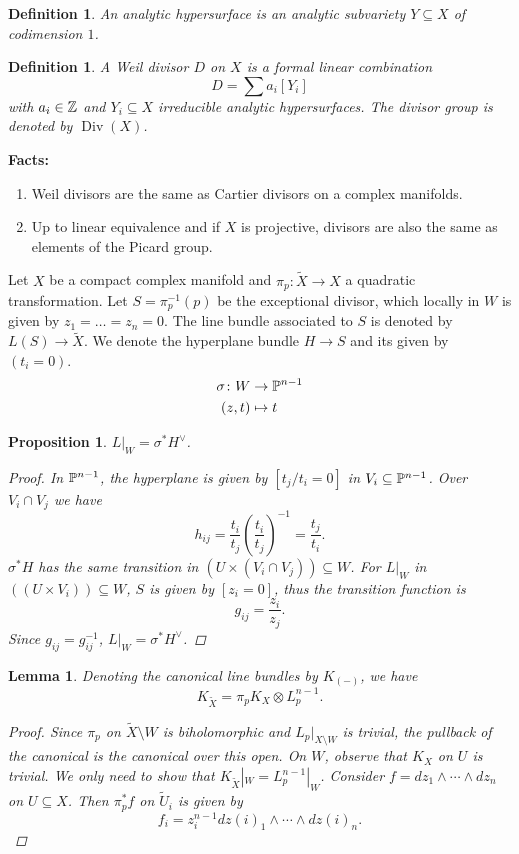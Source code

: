 \documentclass[A4paper, british, reqno]{amsart}
\theoremstyle{darkgreentheorem}
\newtheorem{lm}[thm]{Lemma}
\newtheorem{prop}[thm]{Proposition}
\theoremstyle{darkbluedefinition}
\newtheorem{defn}[thm]{Definition}
\theoremstyle{darkredexample}
\theoremstyle{remark}
\DeclareMathOperator{\Div}{Div}
\newcommand{\1}{\mathbbm{1}}
\newcommand{\ot}{\otimes}
\newcommand{\dual}{^{\vee}}
\newcommand{\tms}{\times}
\newcommand{\sub}{\subseteq}
\begin{document}
\begin{defn}
    An \textit{analytic hypersurface} is an analytic subvariety $Y\sub X$ of codimension $1$.
\end{defn}

\begin{defn}
    A \textit{Weil divisor} $D$ on $X$ is a formal linear combination
    \[ D=\sum a_{i}[Y_{i}] \]
    with $a_{i}\in \Z$ and $Y_{i}\sub X$ irreducible analytic hypersurfaces.
    The divisor group is denoted by $\Div(X)$.
\end{defn}

\textbf{Facts:}
\begin{enumerate}
    \item Weil divisors are the same as Cartier divisors on a complex manifolds.
    \item Up to linear equivalence and if $X$ is projective, divisors are also the same as elements of the Picard group.
\end{enumerate}

Let $X$ be a compact complex manifold and $\pi_{p}\colon \tilde{X}\to X$ a quadratic transformation.
Let $S=\pi_{p}^{-1}(p)$ be the exceptional divisor, which locally in $W$ is given by $z_{1}=\ldots =z_{n}=0$.
The line bundle associated to $S$ is denoted by $L(S)\to \tilde{X}$.
We denote the hyperplane bundle $H\to S$ and its given by $(t_{i}=0)$.
\begin{align*}
    \sigma \colon W & \to \P^{n-1} \\
    (z,t) & \mapsto t
\end{align*}

\begin{prop}
    $L|_{W}=\sigma^{*}H\dual$.
    \begin{proof}
	In $\P^{n-1}$, the hyperplane is given by $[t_{j}/t_{i}=0]$ in $V_{i}\sub \P^{n-1}$.
	Over $V_{i}\cap V_{j}$ we have
	\[ h_{ij}=\frac{t_{i}}{t_{j}}\left(\frac{t_{i}}{t_{j}}\right)^{-1}=\frac{t_{j}}{t_{i}}.\]
	$\sigma^{*}H$ has the same transition in $(U\tms (V_{i}\cap V_{j}))\sub W$.
	For $L|_{W}$ in $((U\tms V_{i}))\sub W$, $S$ is given by $[z_{i}=0]$, thus the transition function is
	\[ g_{ij}=\frac{z_{i}}{z_{j}}. \]
	Since $g_{ij}=g_{ij}^{-1}$, $L|_{W}=\sigma^{*}H\dual $.
    \end{proof}
\end{prop}

\begin{lm}
    Denoting the canonical line bundles by $K_{(-)}$, we have
    \[ K_{\tilde{X}}=\pi_{p}K_{X}\ot L_{p}^{n-1}. \]
    \begin{proof}
	Since $\pi_{p}$ on $\tilde{X}\setminus W$ is biholomorphic and $L_{p}|_{X\setminus W}$ is trivial, the pullback of the canonical is the canonical over this open.
	On $W$, observe that $K_{X}$ on $U$ is trivial.
	We only need to show that $K_{\tilde{X}}|_{W}=L_{p}^{n-1}|_{W}$.
	Consider $f=dz_{1}\wedge \cdots \wedge dz_{n}$ on $U\sub X$.
	Then $\pi_{p}^{*}f$ on $\tilde{U}_{i}$ is given by
	\[ f_{i}=z_{i}^{n-1}dz(i)_{1}\wedge \cdots \wedge dz(i)_{n}.\]
    \end{proof}
\end{lm}
\end{document}
